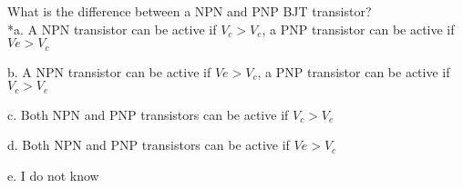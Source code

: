 
What is the difference between a NPN and PNP BJT transistor? \\

*a. A NPN transistor can be active if \( V_c > V_e \), a PNP transistor can be active if \( Ve > V_c \)

b. A NPN transistor can be active if \( Ve > V_c \), a PNP transistor can be active if \( V_c > V_e \)

c. Both NPN and PNP transistors can be active if \( V_c > V_e \)

d. Both NPN and PNP transistors can be active if \( Ve > V_c \)

e. I do not know \\ 
